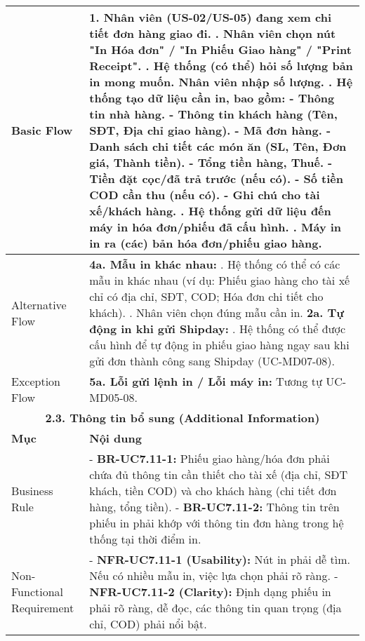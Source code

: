 \begin{longtable}{|m{4cm}|p{11cm}|}
Basic Flow & 1. Nhân viên (US-02/US-05) đang xem chi tiết đơn hàng giao đi. \newline 2. Nhân viên chọn nút "In Hóa đơn" / "In Phiếu Giao hàng" / "Print Receipt". \newline 3. Hệ thống (có thể) hỏi số lượng bản in mong muốn. Nhân viên nhập số lượng. \newline 4. Hệ thống tạo dữ liệu cần in, bao gồm: \newline    - Thông tin nhà hàng. \newline    - Thông tin khách hàng (Tên, SĐT, Địa chỉ giao hàng). \newline    - Mã đơn hàng. \newline    - Danh sách chi tiết các món ăn (SL, Tên, Đơn giá, Thành tiền). \newline    - Tổng tiền hàng, Thuế. \newline    - Tiền đặt cọc/đã trả trước (nếu có). \newline    - Số tiền COD cần thu (nếu có). \newline    - Ghi chú cho tài xế/khách hàng. \newline 5. Hệ thống gửi dữ liệu đến máy in hóa đơn/phiếu đã cấu hình. \newline 6. Máy in in ra (các) bản hóa đơn/phiếu giao hàng. \\
\hline
Alternative Flow & \textbf{4a. Mẫu in khác nhau:} \newline    1. Hệ thống có thể có các mẫu in khác nhau (ví dụ: Phiếu giao hàng cho tài xế chỉ có địa chỉ, SĐT, COD; Hóa đơn chi tiết cho khách). \newline    2. Nhân viên chọn đúng mẫu cần in. \newline \textbf{2a. Tự động in khi gửi Shipday:} \newline    1. Hệ thống có thể được cấu hình để tự động in phiếu giao hàng ngay sau khi gửi đơn thành công sang Shipday (UC-MD07-08). \\
\hline
Exception Flow & \textbf{5a. Lỗi gửi lệnh in / Lỗi máy in:} Tương tự UC-MD05-08. \\
\hline
\multicolumn{2}{|c|}{\textbf{2.3. Thông tin bổ sung (Additional Information)}} \\
\hline
\textbf{Mục} & \textbf{Nội dung} \\
\hline
Business Rule & - \textbf{BR-UC7.11-1:} Phiếu giao hàng/hóa đơn phải chứa đủ thông tin cần thiết cho tài xế (địa chỉ, SĐT khách, tiền COD) và cho khách hàng (chi tiết đơn hàng, tổng tiền). \newline - \textbf{BR-UC7.11-2:} Thông tin trên phiếu in phải khớp với thông tin đơn hàng trong hệ thống tại thời điểm in. \\
\hline
Non-Functional Requirement & - \textbf{NFR-UC7.11-1 (Usability):} Nút in phải dễ tìm. Nếu có nhiều mẫu in, việc lựa chọn phải rõ ràng. \newline - \textbf{NFR-UC7.11-2 (Clarity):} Định dạng phiếu in phải rõ ràng, dễ đọc, các thông tin quan trọng (địa chỉ, COD) phải nổi bật. \\
\hline
\end{longtable}

